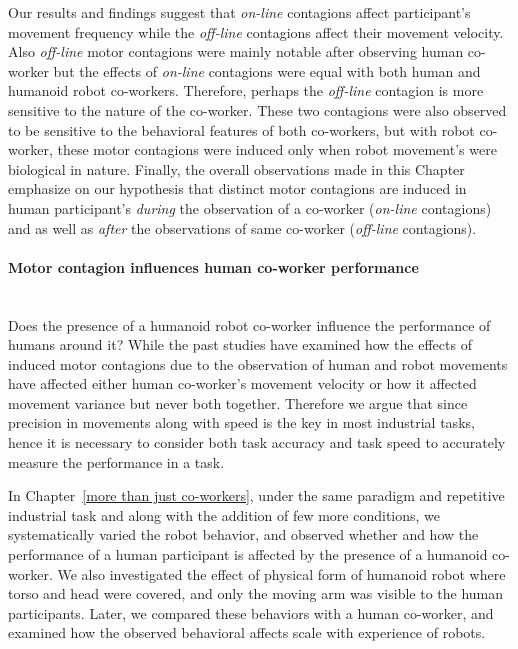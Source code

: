 Our results and findings suggest that \textit{on-line} contagions affect participant's movement frequency while the \textit{off-line} contagions affect their movement velocity. Also \textit{off-line} motor contagions were mainly notable after observing human co-worker but the effects of \textit{on-line} contagions were equal with both human and humanoid robot co-workers. Therefore, perhaps the \textit{off-line} contagion is more sensitive to the nature of the co-worker. These two contagions were also observed to be sensitive to the behavioral features of both co-workers, but with robot co-worker, these motor contagions were induced only when robot movement's were biological in nature.  Finally, the overall observations made in this Chapter emphasize on our hypothesis that distinct motor contagions are induced in human participant's \emph{during} the observation of a co-worker (\textit{on-line} contagions) and as well as \emph{after} the observations of same co-worker (\textit{off-line} contagions).



\paragraph*{\LARGE {Motor contagion influences human co-worker performance \\}\\}

Does the presence of a humanoid robot co-worker influence the performance of humans around it? While the past studies have examined how the effects of induced motor contagions due to the observation of human and robot movements have affected either human co-worker's movement velocity or how it affected movement variance but never both together. Therefore we argue that since precision in movements along with speed is the key in most industrial tasks, hence it is necessary to consider both task accuracy and task speed to accurately measure the performance in a task.

In Chapter~\ref{more than just co-workers}, under the same paradigm and repetitive industrial task and along with the addition of few more conditions, we systematically varied the robot behavior, and observed whether and how the performance of a human participant is affected by the presence of a humanoid co-worker. We also investigated the effect of physical form of humanoid robot where torso and head were covered, and only the moving arm was visible to the human participants. Later, we compared these behaviors with a human co-worker, and examined how the observed behavioral affects scale with experience of robots. 

